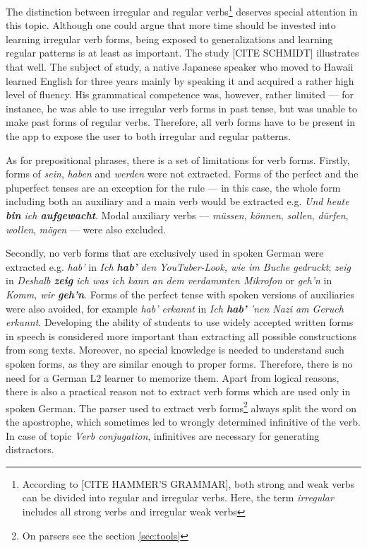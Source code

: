The distinction between irregular and regular verbs\footnote{According to [CITE HAMMER'S GRAMMAR], both strong and weak verbs can be divided into regular and irregular verbs. Here, the term \textit{irregular} includes all strong verbs and irregular weak verbs} deserves special attention in this topic. Although one could argue that more time should be invested into learning irregular verb forms, being exposed to generalizations and learning regular patterns is at least as important. The study [CITE SCHMIDT] illustrates that well. The subject of study, a native Japanese speaker who moved to Hawaii learned English for three years mainly by speaking it and acquired a rather high level of fluency. His grammatical competence was, however, rather limited --- for instance, he was able to use irregular verb forms in past tense, but was unable to make past forms of regular verbs. Therefore, all verb forms have to be present in the app to expose the user to both irregular and regular patterns.

As for prepositional phrases, there is a set of limitations for verb forms. Firstly, forms of \textit{sein}, \textit{haben} and \textit{werden} were not extracted. Forms of the perfect and the pluperfect tenses are an exception for the rule --- in this case, the whole form including both an auxiliary and a main verb would be extracted e.g. \textit{Und heute \textbf{bin} ich \textbf{aufgewacht}}. Modal auxiliary verbs --- \textit{müssen}, \textit{können}, \textit{sollen}, \textit{dürfen}, \textit{wollen}, \textit{mögen} --- were also excluded. 

Secondly, no verb forms that are exclusively used in spoken German were extracted e.g. \textit{hab'} in \textit{Ich \textbf{hab'} den YouTuber-Look, wie im Buche gedruckt}; \textit{zeig} in \textit{Deshalb \textbf{zeig} ich was ich kann an dem verdammten Mikrofon} or \textit{geh'n} in \textit{Komm, wir \textbf{geh'n}}. Forms of the perfect tense with spoken versions of auxiliaries were also avoided, for example \textit{hab' erkannt} in \textit{Ich \textbf{hab'} 'nen Nazi am Geruch erkannt}. Developing the ability of students to use widely accepted written forms in speech is considered more important than extracting all possible constructions from song texts. Moreover, no special knowledge is needed to understand such spoken forms, as they are similar enough to proper forms. Therefore, there is no need for a German L2 learner to memorize them. Apart from logical reasons, there is also a practical reason not to extract verb forms which are used only in spoken German. The parser used to extract verb forms\footnote{On parsers see the section \ref{sec:tools}} always split the word on the apostrophe, which sometimes led to wrongly determined infinitive of the verb. In case of topic \textit{Verb conjugation}, infinitives are necessary for generating distractors. 

